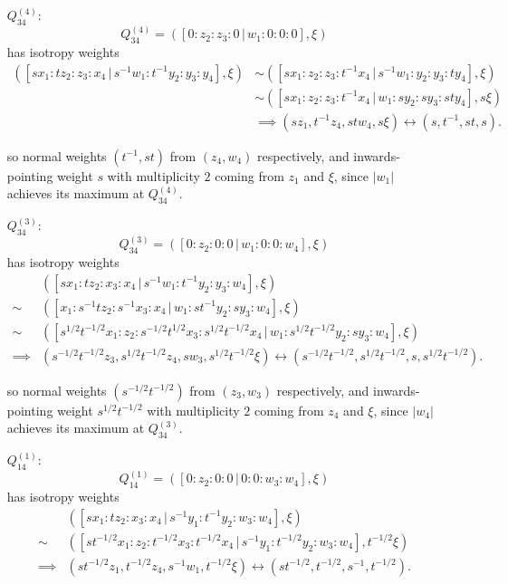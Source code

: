 \documentclass{article}
\begin{document}
\begin{itemize}
		\item[$Q_{34}^{(4)}$:]
		\[
			Q_{34}^{(4)} = \left( [ 0 : z_{2} : z_{3} : 0 \, | \, w_{1} : 0 : 0 : 0 ], \xi \right)
		\]
		has isotropy weights
		\begin{align*}
			\left( [sx_{1} : tz_{2} : z_{3} : x_{4} \, | \, s^{-1}w_{1} : t^{-1}y_{2} : y_{3} : y_{4}], \xi \right) &\sim \left( [sx_{1} : z_{2} : z_{3} : t^{-1}x_{4} \, | \, s^{-1}w_{1} : y_{2} : y_{3} : ty_{4}], \xi \right) \\ &\sim \left( [sx_{1} : z_{2} : z_{3} : t^{-1}x_{4} \, | \, w_{1} : sy_{2} : sy_{3} : sty_{4}], s\xi \right) \\ &\implies (sz_{1}, t^{-1}z_{4}, stw_{4}, s\xi) \longleftrightarrow (s, t^{-1}, st, s).
		\end{align*}
		
		so normal weights $(t^{-1}, st)$ from $(z_{4}, w_{4})$ respectively, and inwards-pointing weight $s$ with multiplicity $2$ coming from $z_{1}$ and $\xi$, since $|w_{1}|$ achieves its maximum at $Q_{34}^{(4)}$.
	
		\item[$Q_{34}^{(3)}$:]
		\[
			Q_{34}^{(3)} = \left( [ 0 : z_{2} : 0 : 0 \, | \, w_{1} : 0 : 0 : w_{4} ], \xi \right)
		\]
		has isotropy weights
		\begin{align*}
			& \left( [sx_{1} : tz_{2} : x_{3} : x_{4} \, | \, s^{-1}w_{1} : t^{-1}y_{2} : y_{3} : w_{4}], \xi \right) \\ \sim &\left( [x_{1} : s^{-1}tz_{2} : s^{-1}x_{3} : x_{4} \, | \, w_{1} : st^{-1}y_{2} : sy_{3} : w_{4}], \xi \right) \\ \sim &\left( [ s^{1/2}t^{-1/2}x_{1} : z_{2} : s^{-1/2}t^{1/2}x_{3} : s^{1/2}t^{-1/2}x_{4} \, | \, w_{1} : s^{1/2}t^{-1/2}y_{2} : sy_{3} : w_{4}], \xi \right) \\ \implies &(s^{-1/2}t^{-1/2}z_{3}, s^{1/2}t^{-1/2}z_{4}, sw_{3}, s^{1/2}t^{-1/2} \xi) \longleftrightarrow (s^{-1/2}t^{-1/2}, s^{1/2}t^{-1/2}, s, s^{1/2}t^{-1/2}).
		\end{align*}
		
		so normal weights $(s^{-1/2}t^{-1/2})$ from $(z_{3}, w_{3})$ respectively, and inwards-pointing weight $s^{1/2}t^{-1/2}$ with multiplicity $2$ coming from $z_{4}$ and $\xi$, since $|w_{4}|$ achieves its maximum at $Q_{34}^{(3)}$.
	
		\item[$Q_{14}^{(1)}$:]
		\[
		Q_{14}^{(1)} = \left( [ 0 : z_{2} : 0 : 0 \, | \, 0 : 0 : w_{3} : w_{4} ], \xi \right)
		\]
		has isotropy weights
		\begin{align*}
			& \left( [sx_{1} : tz_{2} : x_{3} : x_{4} \, | \, s^{-1}y_{1} : t^{-1}y_{2} : w_{3} : w_{4}], \xi \right) \\ \sim & \left( [st^{-1/2}x_{1} : z_{2} : t^{-1/2}x_{3} : t^{-1/2}x_{4} \, | \, s^{-1}y_{1} : t^{-1/2}y_{2} : w_{3} : w_{4}], t^{-1/2}\xi \right) \\ \implies &(st^{-1/2}z_{1}, t^{-1/2}z_{4}, s^{-1}w_{1}, t^{-1/2}\xi) \longleftrightarrow (st^{-1/2}, t^{-1/2}, s^{-1}, t^{-1/2}).
		\end{align*}
		

\end{itemize}
\end{document}
